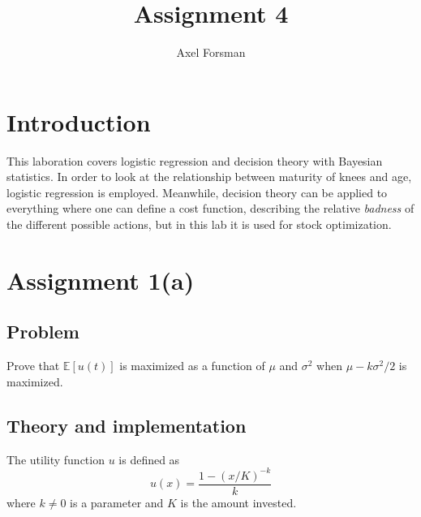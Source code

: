 \documentclass[11pt, a4paper]{article}
\title{Assignment 4}
\author{Axel Forsman}
\begin{document}
\maketitle

\section{Introduction}
This laboration covers logistic regression and decision theory with Bayesian statistics.
In order to look at the relationship between maturity of knees and age,
logistic regression is employed.
Meanwhile, decision theory can be applied to everything
where one can define a cost function,
describing the relative \emph{badness} of the different possible actions,
but in this lab it is used for stock optimization.

\section{Assignment 1(a)}\label{sec:max_proof}
\subsection{Problem}
Prove that $\mathbb E[u(t)]$ is maximized as a function of
$\mu$ and $\sigma^2$ when $\mu - k\sigma^2/2$ is maximized.
\subsection{Theory and implementation}
The utility function $u$ is defined as
\begin{equation}\label{eq:utility}
u(x) = \frac{1 - (x / K)^{-k}}k
\end{equation}
where $k \neq 0$ is a parameter and $K$ is the amount invested.
\end{document}
